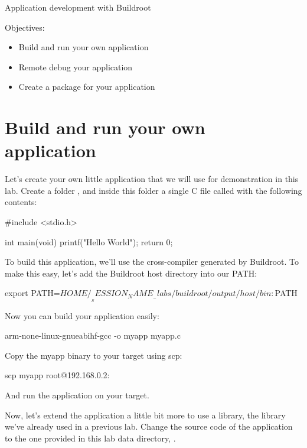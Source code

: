 \subchapter
{Application development with Buildroot}
{Objectives:
  \begin{itemize}
  \item Build and run your own application
  \item Remote debug your application
  \item Create a package for your application
  \end{itemize}
}

\section{Build and run your own application}

Let's create your own little application that we will use for
demonstration in this lab. Create a folder ,
and inside this folder a single C file called  with the
following contents:

\begin{fileinput}
#include <stdio.h>

int main(void) {
        printf("Hello World\n");
        return 0;
}
\end{fileinput}

To build this application, we'll use the cross-compiler generated by
Buildroot. To make this easy, let's add the Buildroot host directory
into our PATH:

\begin{bashinput}
export PATH=$HOME/__SESSION_NAME__-labs/buildroot/output/host/bin:$PATH
\end{bashinput}

Now you can build your application easily:

\begin{bashinput}
arm-none-linux-gnueabihf-gcc -o myapp myapp.c
\end{bashinput}

Copy the myapp binary to your target using scp:

\begin{bashinput}
scp myapp root@192.168.0.2:
\end{bashinput}

And run the  application on your target.

Now, let's extend the application a little bit more to use a library,
the  library we've already used in a previous
lab. Change the source code of the application to the one provided in
this lab data directory, .

